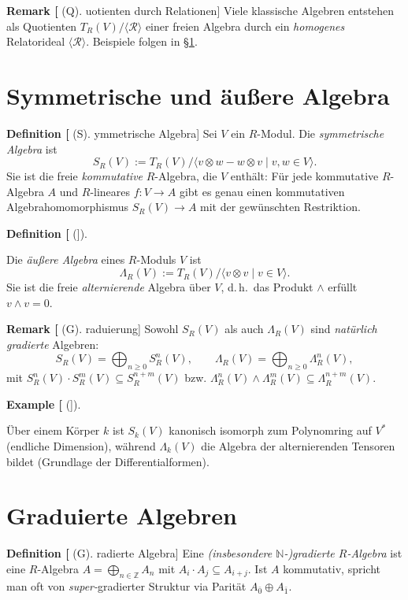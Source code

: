 \documentclass[10pt, letterpaper]{article}
\newcommand{\N}{\mathbb{N}}
\newcommand{\Z}{\mathbb{Z}}
\newcommand{\CustomHeading}[3]{%
  \par\medskip\noindent%
  \textbf{#1 #2} \textnormal{(#3)}.\enskip%
}
\newenvironment{DEF}[2]{\begin{unitbox}\CustomHeading{Definition}{#1}{#2}}{\end{unitbox}}
\newenvironment{REM}[2]{\begin{unitbox}\CustomHeading{Remark}{#1}{#2}}{\end{unitbox}}
\newenvironment{EXA}[2]{\begin{unitbox}\CustomHeading{Example}{#1}{#2}}{\end{unitbox}}
\begin{document}
\begin{REM}[Quotienten durch Relationen]
Viele klassische Algebren entstehen als Quotienten \(T_R(V)/\langle\mathcal{R}\rangle\) einer freien Algebra
durch ein \emph{homogenes} Relatorideal \(\langle\mathcal{R}\rangle\). Beispiele folgen in §\ref{sec:symm-ext}.
\end{REM}

\section{Symmetrische und äußere Algebra}
\label{sec:symm-ext}
\begin{DEF}[Symmetrische Algebra]
Sei \(V\) ein \(R\)-Modul. Die \emph{symmetrische Algebra} ist
\[
S_R(V):=T_R(V)\big/\langle v\otimes w - w\otimes v \mid v,w\in V\rangle.
\]
Sie ist die freie \emph{kommutative} \(R\)-Algebra, die \(V\) enthält: Für jede kommutative \(R\)-Algebra \(A\)
und \(R\)-lineares \(f:V\to A\) gibt es genau einen kommutativen Algebrahomomorphismus \(S_R(V)\to A\) mit
der gewünschten Restriktion.
\end{DEF}

\begin{DEF}[]
Die \emph{äußere Algebra} eines \(R\)-Moduls \(V\) ist
\[
\Lambda_R(V):=T_R(V)\big/\langle v\otimes v \mid v\in V\rangle.
\]
Sie ist die freie \emph{alternierende} Algebra über \(V\), d.\,h.\ das Produkt \(\wedge\) erfüllt \(v\wedge v=0\).
\end{DEF}

\begin{REM}[Graduierung]
Sowohl \(S_R(V)\) als auch \(\Lambda_R(V)\) sind \emph{natürlich gradierte} Algebren:
\[
S_R(V)=\bigoplus_{n\ge 0} S^n_R(V),\qquad
\Lambda_R(V)=\bigoplus_{n\ge 0} \Lambda^n_R(V),
\]
mit \(S^n_R(V)\cdot S^m_R(V)\subseteq S^{n+m}_R(V)\) bzw.
\(\Lambda^n_R(V)\wedge \Lambda^m_R(V)\subseteq \Lambda^{n+m}_R(V)\).
\end{REM}

\begin{EXA}[]
Über einem Körper \(k\) ist \(S_k(V)\) kanonisch isomorph zum Polynomring auf \(V^\ast\) (endliche Dimension),
während \(\Lambda_k(V)\) die Algebra der alternierenden Tensoren bildet (Grundlage der Differentialformen).
\end{EXA}

\section{Graduierte Algebren}
\begin{DEF}[Gradierte Algebra]
Eine \emph{(insbesondere \(\N\)-)gradierte \(R\)-Algebra} ist eine \(R\)-Algebra \(A=\bigoplus_{n\in\Z}A_n\)
mit \(A_i\cdot A_j\subseteq A_{i+j}\).
Ist \(A\) kommutativ, spricht man oft von \emph{super-}gradierter Struktur via Parität \(A_{\bar 0}\oplus A_{\bar 1}\).
\end{DEF}
\end{document}
